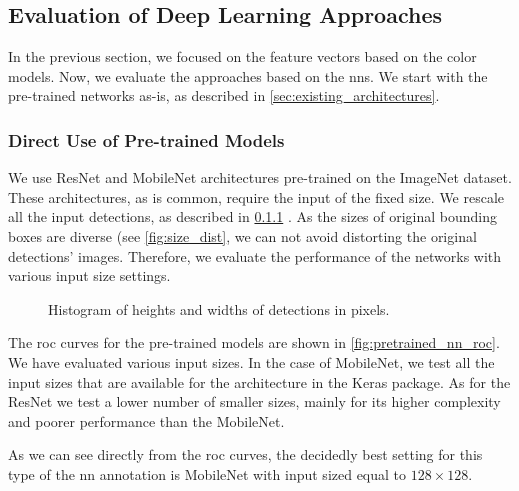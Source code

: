\subsection{Evaluation of Deep Learning Approaches}

In the previous section, we focused on the feature vectors based on the color models. Now, we evaluate the approaches based on the \glspl{nn}. We start with the pre-trained networks as-is, as described in \autoref{sec:existing_architectures}.

\subsubsection{Direct Use of Pre-trained Models}


We use ResNet and MobileNet architectures
pre-trained on the ImageNet dataset. These architectures, as is common,
require the input of the fixed size. We rescale all the input detections, as described in \ref{} . As the sizes of original bounding boxes are diverse (see
\autoref{fig:size_dist}, we can not avoid distorting the original detections' images.
Therefore, we evaluate the performance of the networks with various input size settings.

\begin{figure}
    \centering
    \def\svgwidth{\columnwidth}
    
    \caption{Histogram of heights and widths of detections in pixels.}
    \label{fig:size_dist}
\end{figure}

The \gls{roc} curves for the pre-trained models are shown in \autoref{fig:pretrained_nn_roc}.
We have evaluated various input sizes. In the case of MobileNet, we test
all the input sizes that are available for the architecture in the Keras package. As for the 
ResNet we test a lower number of smaller sizes, mainly for its higher
complexity and poorer performance than the MobileNet.

As we can see directly from the \gls{roc} curves, the decidedly best setting for this type of the \gls{nn} annotation is MobileNet with input sized equal to $128 \times 128$. 

